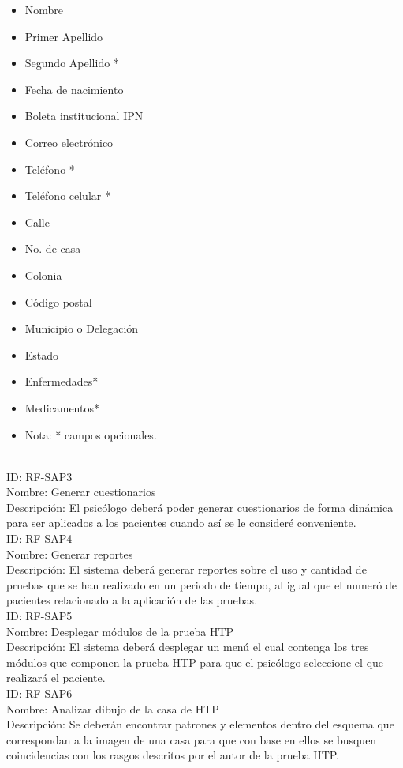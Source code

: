\begin{itemize}
    \item Nombre
    \item Primer Apellido
    \item Segundo Apellido *
    \item Fecha de nacimiento
    \item Boleta institucional IPN
    \item Correo electrónico
    \item Teléfono *
    \item Teléfono celular *
    \item Calle
    \item No. de casa
    \item Colonia
    \item Código postal
    \item Municipio o Delegación
    \item Estado
    \item Enfermedades*
    \item Medicamentos*
    \item Nota: * campos opcionales.
\end{itemize}
\\

\noindent
ID: RF-SAP3\\
Nombre: Generar cuestionarios\\
Descripción: El psicólogo deberá poder generar cuestionarios de forma dinámica para ser aplicados a los pacientes cuando así se le consideré conveniente.
\\

\noindent
ID: RF-SAP4\\
Nombre: Generar reportes\\
Descripción: El sistema deberá generar reportes sobre el uso y cantidad de pruebas que se han realizado en un periodo de tiempo, al igual que el numeró de pacientes relacionado a la aplicación de las pruebas.
\\

\noindent
ID: RF-SAP5\\
Nombre: Desplegar módulos de la prueba HTP\\
Descripción: El sistema deberá desplegar un menú el cual contenga los tres módulos que componen la prueba HTP para que el psicólogo seleccione el que realizará el paciente.
\\

\noindent
ID: RF-SAP6\\
Nombre: Analizar dibujo de la casa de HTP\\
Descripción: Se deberán encontrar patrones y elementos dentro del esquema que correspondan a la imagen de una casa para que con base en ellos se busquen coincidencias con los rasgos descritos por el autor de la prueba HTP. 
\\

